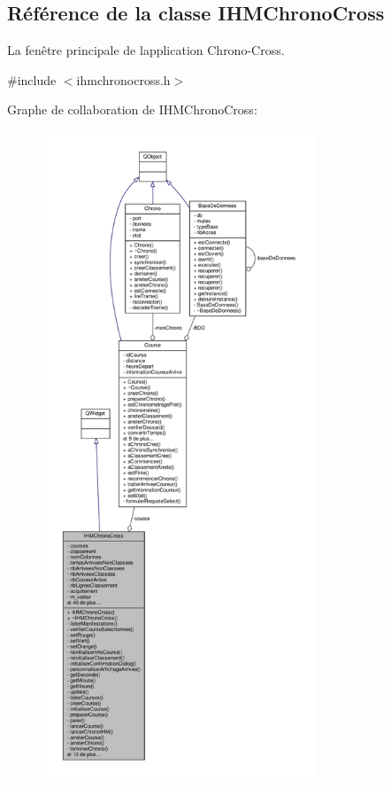 \hypertarget{class_i_h_m_chrono_cross}{}\subsection{Référence de la classe I\+H\+M\+Chrono\+Cross}
\label{class_i_h_m_chrono_cross}


La fenêtre principale de l\textquotesingle{}application Chrono-\/\+Cross.  




{\ttfamily \#include $<$ihmchronocross.\+h$>$}



Graphe de collaboration de I\+H\+M\+Chrono\+Cross\+:\nopagebreak
\begin{figure}[H]
\begin{center}
\leavevmode
\includegraphics[height=550pt]{class_i_h_m_chrono_cross__coll__graph}
\end{center}
\end{figure}
